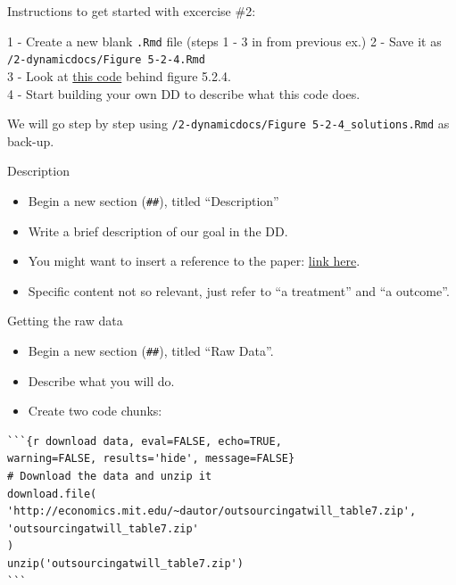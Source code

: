 \documentclass[ignorenonframetext,]{beamer}
\providecommand{\tightlist}{%
  \setlength{\itemsep}{0pt}\setlength{\parskip}{0pt}}
\begin{document}
\begin{frame}[fragile]{Instructions to get started with excercise \#2:}
\protect\hypertarget{instructions-to-get-started-with-excercise-2}{}

1 - Create a new blank \texttt{.Rmd} file (steps 1 - 3 in from previous
ex.) 2 - Save it as \texttt{/2-dynamicdocs/Figure\ 5-2-4.Rmd}\\
3 - Look at
\href{https://github.com/vikjam/mostly-harmless-replication/blob/master/05\%20Fixed\%20Effects\%2C\%20DD\%20and\%20Panel\%20Data/Figure\%205-2-4.r}{this
code} behind figure 5.2.4.\\
4 - Start building your own DD to describe what this code does.

We will go step by step using
\texttt{/2-dynamicdocs/Figure\ 5-2-4\_solutions.Rmd} as back-up.

\end{frame}

\begin{frame}[fragile]{Description}
\protect\hypertarget{description}{}

\begin{itemize}
\item
  Begin a new section (\texttt{\#\#}), titled ``Description''
\item
  Write a brief description of our goal in the DD.
\item
  You might want to insert a reference to the paper:
  \href{http://economics.mit.edu/files/589}{link here}.
\item
  Specific content not so relevant, just refer to ``a treatment'' and
  ``a outcome''.
\end{itemize}

\end{frame}

\begin{frame}[fragile]{Getting the raw data}
\protect\hypertarget{getting-the-raw-data}{}

\begin{itemize}
\tightlist
\item
  Begin a new section (\texttt{\#\#}), titled ``Raw Data''.\\
\item
  Describe what you will do.\\
\item
  Create two code chunks:
\end{itemize}

\begin{verbatim}
```{r download data, eval=FALSE, echo=TRUE, 
warning=FALSE, results='hide', message=FALSE}
# Download the data and unzip it
download.file(
'http://economics.mit.edu/~dautor/outsourcingatwill_table7.zip', 
'outsourcingatwill_table7.zip'
)
unzip('outsourcingatwill_table7.zip')
```
\end{verbatim}

\end{frame}
\end{document}
